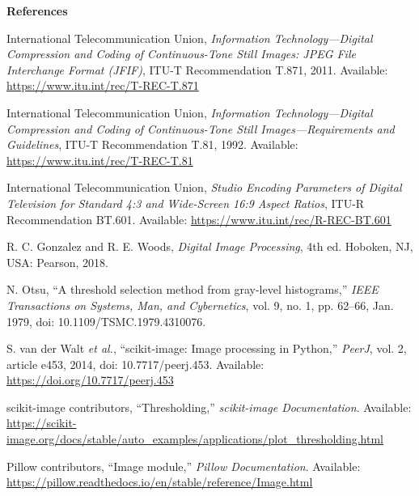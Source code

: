 
{}

\begin{center}
    {\normalfont\normalsize\bfseries References}
\end{center}

\vspace{6.0em}

\begin{enumerate}[label={[\arabic*]}, leftmargin=*]
\setlength{\itemsep}{0.5em}

\item International Telecommunication Union,
\textit{Information Technology---Digital Compression and Coding of Continuous-Tone Still Images: JPEG File Interchange Format (JFIF)},
ITU-T Recommendation T.871, 2011.
Available: \url{https://www.itu.int/rec/T-REC-T.871}

\item International Telecommunication Union,
\textit{Information Technology---Digital Compression and Coding of Continuous-Tone Still Images---Requirements and Guidelines},
ITU-T Recommendation T.81, 1992.
Available: \url{https://www.itu.int/rec/T-REC-T.81}

\item International Telecommunication Union,
\textit{Studio Encoding Parameters of Digital Television for Standard 4:3 and Wide-Screen 16:9 Aspect Ratios},
ITU-R Recommendation BT.601.
Available: \url{https://www.itu.int/rec/R-REC-BT.601}

\item R. C. Gonzalez and R. E. Woods,
\textit{Digital Image Processing}, 4th ed.
Hoboken, NJ, USA: Pearson, 2018.

\item N. Otsu,
``A threshold selection method from gray-level histograms,''
\textit{IEEE Transactions on Systems, Man, and Cybernetics},
vol. 9, no. 1, pp. 62--66, Jan. 1979,
doi: 10.1109/TSMC.1979.4310076.

\item S. van der Walt \textit{et al.},
``scikit-image: Image processing in Python,''
\textit{PeerJ}, vol. 2, article e453, 2014,
doi: 10.7717/peerj.453.
Available: \url{https://doi.org/10.7717/peerj.453}

\item scikit-image contributors,
``Thresholding,''
\textit{scikit-image Documentation}.
Available: \url{https://scikit-image.org/docs/stable/auto\_examples/applications/plot\_thresholding.html}

\item Pillow contributors,
``Image module,''
\textit{Pillow Documentation}.
Available: \url{https://pillow.readthedocs.io/en/stable/reference/Image.html}

\end{enumerate}
